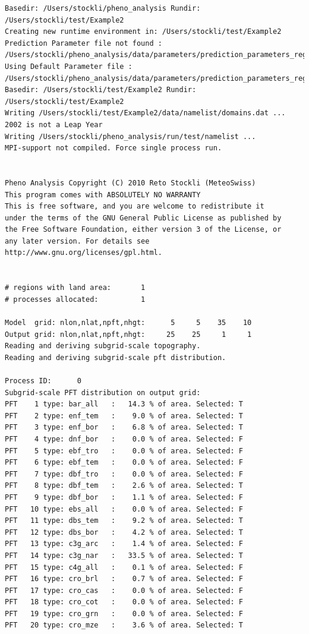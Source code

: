 \documentclass[a4paper,12pt]{article}
\begin{document}
\begin{verbatim}
Basedir: /Users/stockli/pheno_analysis Rundir: /Users/stockli/test/Example2 
Creating new runtime environment in: /Users/stockli/test/Example2 
Prediction Parameter file not found : 
/Users/stockli/pheno_analysis/data/parameters/prediction_parameters_regional_Example2.dat 
Using Default Parameter file : 
/Users/stockli/pheno_analysis/data/parameters/prediction_parameters_regional.dat 
Basedir: /Users/stockli/test/Example2 Rundir: /Users/stockli/test/Example2 
Writing /Users/stockli/test/Example2/data/namelist/domains.dat ...
2002 is not a Leap Year 
Writing /Users/stockli/pheno_analysis/run/test/namelist ...
MPI-support not compiled. Force single process run.


Pheno Analysis Copyright (C) 2010 Reto Stockli (MeteoSwiss)
This program comes with ABSOLUTELY NO WARRANTY
This is free software, and you are welcome to redistribute it
under the terms of the GNU General Public License as published by
the Free Software Foundation, either version 3 of the License, or
any later version. For details see http://www.gnu.org/licenses/gpl.html.


# regions with land area:       1
# processes allocated:          1

Model  grid: nlon,nlat,npft,nhgt:      5     5    35    10
Output grid: nlon,nlat,npft,nhgt:     25    25     1     1
Reading and deriving subgrid-scale topography.
Reading and deriving subgrid-scale pft distribution.

Process ID:      0
Subgrid-scale PFT distribution on output grid: 
PFT    1 type: bar_all   :   14.3 % of area. Selected: T
PFT    2 type: enf_tem   :    9.0 % of area. Selected: T
PFT    3 type: enf_bor   :    6.8 % of area. Selected: T
PFT    4 type: dnf_bor   :    0.0 % of area. Selected: F
PFT    5 type: ebf_tro   :    0.0 % of area. Selected: F
PFT    6 type: ebf_tem   :    0.0 % of area. Selected: F
PFT    7 type: dbf_tro   :    0.0 % of area. Selected: F
PFT    8 type: dbf_tem   :    2.6 % of area. Selected: T
PFT    9 type: dbf_bor   :    1.1 % of area. Selected: F
PFT   10 type: ebs_all   :    0.0 % of area. Selected: F
PFT   11 type: dbs_tem   :    9.2 % of area. Selected: T
PFT   12 type: dbs_bor   :    4.2 % of area. Selected: T
PFT   13 type: c3g_arc   :    1.4 % of area. Selected: F
PFT   14 type: c3g_nar   :   33.5 % of area. Selected: T
PFT   15 type: c4g_all   :    0.1 % of area. Selected: F
PFT   16 type: cro_brl   :    0.7 % of area. Selected: F
PFT   17 type: cro_cas   :    0.0 % of area. Selected: F
PFT   18 type: cro_cot   :    0.0 % of area. Selected: F
PFT   19 type: cro_grn   :    0.0 % of area. Selected: F
PFT   20 type: cro_mze   :    3.6 % of area. Selected: T


\end{verbatim}
\end{document}
